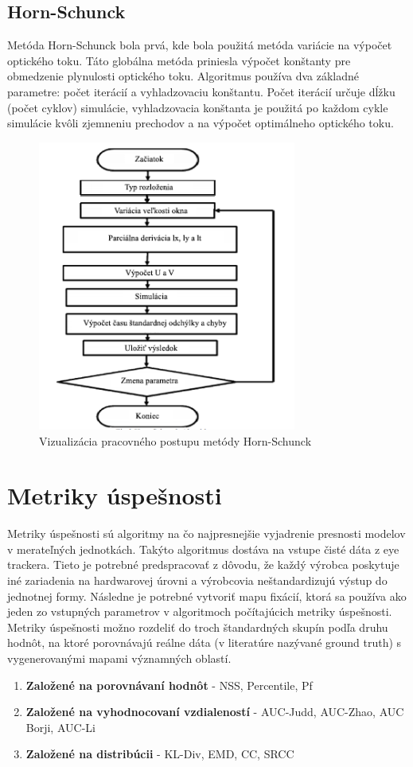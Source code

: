 \subsection{Horn-Schunck}
Metóda Horn-Schunck\cite{hs-original} bola prvá, kde bola použitá metóda variácie na výpočet optického toku.
Táto globálna metóda priniesla výpočet  konštanty pre obmedzenie plynulosti optického toku.
Algoritmus používa dva základné parametre: počet iterácií a vyhladzovaciu konštantu.
Počet iterácií určuje dĺžku (počet cyklov) simulácie, vyhladzovacia konštanta je použitá po každom cykle simulácie kvôli zjemneniu prechodov a na výpočet optimálneho optického toku.

\begin{figure}[H]
  \centering
  \includegraphics[width=8.5cm]{pics/horn-schunck.png}
  \caption{Vizualizácia pracovného postupu metódy Horn-Schunck\cite{horn-schunck}}
\end{figure}
\vspace{10mm}

\section{Metriky úspešnosti}
Metriky úspešnosti sú algoritmy na čo najpresnejšie vyjadrenie presnosti modelov v merateľných jednotkách.
Takýto algoritmus dostáva na vstupe čisté dáta z eye trackera.
Tieto je potrebné predspracovať z dôvodu, že každý výrobca poskytuje iné zariadenia na hardwarovej úrovni a výrobcovia neštandardizujú výstup do jednotnej formy.
Následne je potrebné vytvoriť mapu fixácií, ktorá sa používa ako jeden zo vstupných parametrov v algoritmoch počítajúcich metriky úspešnosti.
\\
Metriky úspešnosti možno rozdeliť do troch štandardných skupín podľa druhu hodnôt, na ktoré porovnávajú reálne dáta (v literatúre nazývané ground truth) s vygenerovanými mapami významných oblastí\cite{metrics-1}.
\begin{enumerate}
  \item\textbf{Založené na porovnávaní hodnôt} - NSS, Percentile, Pf
  \item\textbf{Založené na vyhodnocovaní vzdialeností} - AUC-Judd, AUC-Zhao, AUC Borji, AUC-Li
  \item\textbf{Založené na distribúcii} - KL-Div, EMD, CC, SRCC
\end{enumerate}

